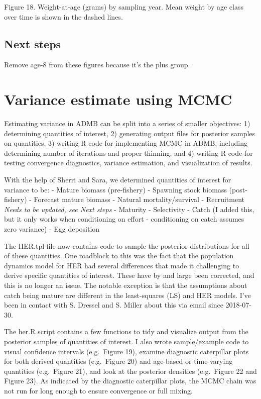 \documentclass[]{article}
\begin{document}
Figure 18. Weight-at-age (grams) by sampling year. Mean weight by age
class over time is shown in the dashed lines.

\subsection{Next steps}\label{next-steps-1}

Remove age-8 from these figures because it's the plus group.

\section{Variance estimate using
MCMC}\label{variance-estimate-using-mcmc}

Estimating variance in ADMB can be split into a series of smaller
objectives: 1) determining quantities of interest, 2) generating output
files for posterior samples on quantities, 3) writing R code for
implementing MCMC in ADMB, including determining number of iterations
and proper thinning, and 4) writing R code for testing convergence
diagnostics, variance estimation, and visualization of results.

With the help of Sherri and Sara, we determined quantities of interest
for variance to be: - Mature biomass (pre-fishery) - Spawning stock
biomass (post-fishery) - Forecast mature biomass - Natural
mortality/survival - Recruitment \emph{Needs to be updated, see Next
steps} - Maturity - Selectivity - Catch (I added this, but it only works
when conditioning on effort - conditioning on catch assumes zero
variance) - Egg deposition

The HER.tpl file now contains code to sample the posterior distributions
for all of these quantities. One roadblock to this was the fact that the
population dynamics model for HER had several differences that made it
challenging to derive specific quantities of interest. These have by and
large been corrected, and this is no longer an issue. The notable
exception is that the assumptions about catch being mature are different
in the least-squares (LS) and HER models. I've been in contact with S.
Dressel and S. Miller about this via email since 2018-07-30.

The her.R script contains a few functions to tidy and visualize output
from the posterior samples of quantities of interest. I also wrote
sample/example code to visual confidence intervals (e.g.~Figure 19),
examine diagnostic caterpillar plots for both derived quantities
(e.g.~Figure 20) and age-based or time-varying quantities (e.g.~Figure
21), and look at the posterior densities (e.g.~Figure 22 and Figure 23).
As indicated by the diagnostic caterpillar plots, the MCMC chain was not
run for long enough to ensure convergence or full mixing.
\end{document}
